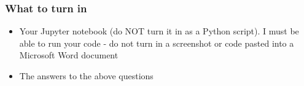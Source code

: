 \documentclass[]{article}
\begin{document}
\hypertarget{what-to-turn-in}{%
\subsubsection{What to turn in}\label{what-to-turn-in}}

\begin{itemize}
\item
  Your Jupyter notebook (do NOT turn it in as a Python script). I must
  be able to run your code - do not turn in a screenshot or code pasted
  into a Microsoft Word document
\item
  The answers to the above questions
\end{itemize}
\end{document}
